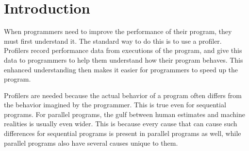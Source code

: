 

\section{Introduction}

When programmers need to improve the performance of their program,
they must first understand it.
The standard way to do this is to use a profiler.
Profilers record performance data from executions of the program,
and give this data to programmers
to help them understand how their program behaves.
This enhanced understanding then makes it easier
for programmers to speed up the program.

Profilers are needed because the actual behavior of a program
often differs from the behavior imagined by the programmer.
This is true even for sequential programs.
For parallel programs,
the gulf between human estimates and machine realities
is usually even wider.
This is because every cause
that can cause such differences for sequential programs
is present in parallel programs as well,
while parallel programs also have several causes unique to them.


